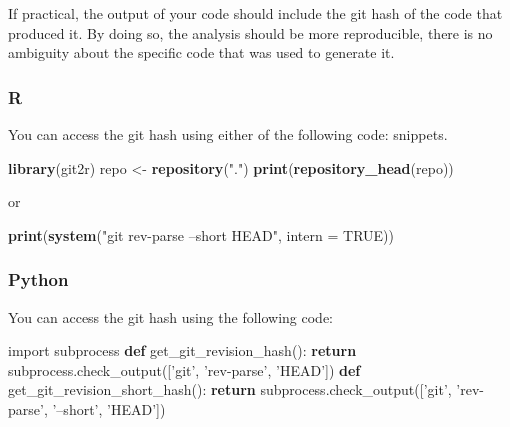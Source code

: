\documentclass[]{book}
\newenvironment{Shaded}{\begin{snugshade}}{\end{snugshade}}
\newcommand{\ControlFlowTok}[1]{\textcolor[rgb]{0.13,0.29,0.53}{\textbf{#1}}}
\newcommand{\DataTypeTok}[1]{\textcolor[rgb]{0.13,0.29,0.53}{#1}}
\newcommand{\ImportTok}[1]{#1}
\newcommand{\KeywordTok}[1]{\textcolor[rgb]{0.13,0.29,0.53}{\textbf{#1}}}
\newcommand{\NormalTok}[1]{#1}
\newcommand{\OtherTok}[1]{\textcolor[rgb]{0.56,0.35,0.01}{#1}}
\newcommand{\StringTok}[1]{\textcolor[rgb]{0.31,0.60,0.02}{#1}}
\begin{document}
If practical, the output of your code should include the git hash of the code that produced it. By doing so, the analysis should be
more reproducible, there is no ambiguity about the specific code that was used to generate it.

\hypertarget{r}{%
\subsubsection*{R}\label{r}}

You can access the git hash using either of the following code:
snippets.

\begin{Shaded}
\begin{Highlighting}[]
\KeywordTok{library}\NormalTok{(git2r)}
\NormalTok{repo <-}\StringTok{ }\KeywordTok{repository}\NormalTok{(}\StringTok{"."}\NormalTok{)}
\KeywordTok{print}\NormalTok{(}\KeywordTok{repository_head}\NormalTok{(repo))}
\end{Highlighting}
\end{Shaded}

or

\begin{Shaded}
\begin{Highlighting}[]
\KeywordTok{print}\NormalTok{(}\KeywordTok{system}\NormalTok{(}\StringTok{"git rev-parse --short HEAD"}\NormalTok{, }\DataTypeTok{intern =} \OtherTok{TRUE}\NormalTok{))}
\end{Highlighting}
\end{Shaded}

\hypertarget{python}{%
\subsubsection*{Python}\label{python}}

You can access the git hash using the following code:

\begin{Shaded}
\begin{Highlighting}[]
\ImportTok{import}\NormalTok{ subprocess}
\KeywordTok{def}\NormalTok{ get_git_revision_hash():}
    \ControlFlowTok{return}\NormalTok{ subprocess.check_output([}\StringTok{'git'}\NormalTok{, }\StringTok{'rev-parse'}\NormalTok{, }\StringTok{'HEAD'}\NormalTok{])}
\KeywordTok{def}\NormalTok{ get_git_revision_short_hash():}
    \ControlFlowTok{return}\NormalTok{ subprocess.check_output([}\StringTok{'git'}\NormalTok{, }\StringTok{'rev-parse'}\NormalTok{, }\StringTok{'--short'}\NormalTok{, }\StringTok{'HEAD'}\NormalTok{])}
\end{Highlighting}
\end{Shaded}
\end{document}
